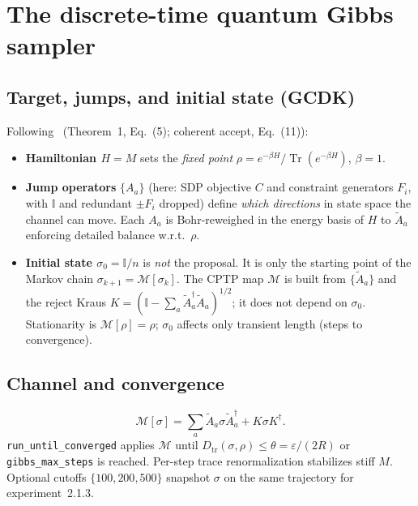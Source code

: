 \documentclass[11pt]{article}
\newcommand{\Tr}{\operatorname{Tr}}
\newcommand{\id}{\mathbb{I}}
\newcommand{\eps}{\varepsilon}
\newcommand{\dist}{D_{\mathrm{tr}}}
\begin{document}
\section{The discrete-time quantum Gibbs sampler}
\label{sec:gibbs}

\subsection{Target, jumps, and initial state (GCDK)}
\label{sec:jumps-vs-init}

Following~\cite{GCDK2024} (Theorem~1, Eq.~(5); coherent accept, Eq.~(11)):

\begin{itemize}
  \item \textbf{Hamiltonian $H=M$} sets the \emph{fixed point}
  $\rho=e^{-\beta H}/\Tr(e^{-\beta H})$, $\beta=1$.
  \item \textbf{Jump operators} $\{A_a\}$ (here: SDP objective $C$ and constraint
  generators $F_i$, with $\id$ and redundant $\pm F_i$ dropped) define
  \emph{which directions} in state space the channel can move. Each $A_a$ is
  Bohr-reweighed in the energy basis of $H$ to $\tilde A_a$ enforcing detailed
  balance w.r.t.\ $\rho$.
  \item \textbf{Initial state $\sigma_0=\id/n$} is \emph{not} the proposal. It is
  only the starting point of the Markov chain $\sigma_{k+1}=\mathcal{M}[\sigma_k]$.
  The CPTP map $\mathcal{M}$ is built from $\{\tilde A_a\}$ and the reject Kraus
  $K=(\id-\sum_a\tilde A_a^\dagger\tilde A_a)^{1/2}$; it does not depend on
  $\sigma_0$. Stationarity is $\mathcal{M}[\rho]=\rho$; $\sigma_0$ affects only
  transient length (steps to convergence).
\end{itemize}

\subsection{Channel and convergence}
\begin{equation}
\mathcal{M}[\sigma]=\sum_a \tilde A_a\sigma\tilde A_a^\dagger
+ K\sigma K^\dagger .
\end{equation}
\texttt{run\_until\_converged} applies $\mathcal{M}$ until
$\dist(\sigma,\rho)\le\theta=\eps/(2R)$ or \texttt{gibbs\_max\_steps} is reached.
Per-step trace renormalization stabilizes stiff $M$. Optional cutoffs
$\{100,200,500\}$ snapshot $\sigma$ on the same trajectory for experiment~2.1.3.
\end{document}
